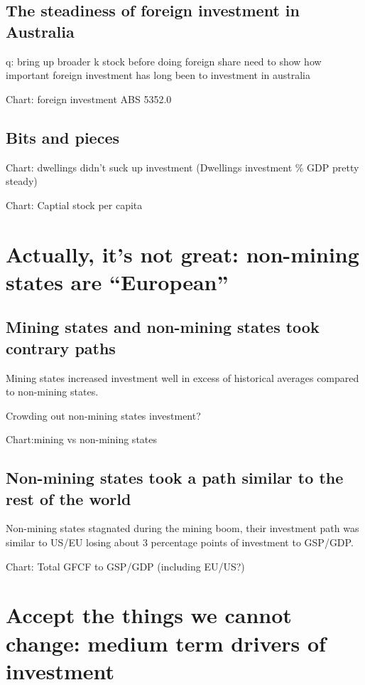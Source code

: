 \section{The steadiness of foreign investment in Australia}
q: bring up broader k stock before doing foreign share
need to show how important foreign investment has long been to investment in australia

Chart: foreign investment ABS 5352.0

\section{Bits and pieces}

Chart: dwellings didn't suck up investment (Dwellings investment \% GDP pretty steady)

Chart: Captial stock per capita


\chapter{Actually, it's not great: non-mining states are ``European''} \label{chap_c}

\section{Mining states and non-mining states took contrary paths}

Mining states increased investment well in excess of historical averages compared to non-mining states. 

Crowding out non-mining states investment?

Chart:mining vs non-mining states

\section{Non-mining states took a path similar to the rest of the world}
Non-mining states stagnated during the mining boom, their investment path was similar to US/EU losing about 3 percentage points of investment to GSP/GDP.

Chart: Total GFCF to GSP/GDP (including EU/US?)



\chapter{Accept the things we cannot change: medium term drivers of investment} \label{chap_d}

